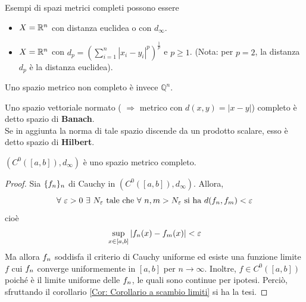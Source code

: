 \begin{example}
    Esempi di spazi metrici completi possono essere
    \begin{itemize}
        \item $X=\mathbb{R}^n$ con distanza euclidea o con $d_\infty$.
        \item $X=\mathbb{R}^n$ con $d_p= \left(\sum\limits_{i=1}^{n}{|x_i - y_i|^p}\right)^{\frac{1}{p}}$ e $p\geq 1$. (Nota: per $p=2$, la distanza $d_p$ è la distanza euclidea).
    \end{itemize}
    Uno spazio metrico non completo è invece $\mathbb{Q}^n$.
\end{example}
\begin{oss}
    Uno spazio vettoriale normato ( $\Rightarrow$ metrico con $d(x, y)= |x-y|$) completo è detto spazio di \textbf{Banach}.\\
    Se in aggiunta la norma di tale spazio discende da un prodotto scalare, esso è detto spazio di \textbf{Hilbert}.
\end{oss}
\begin{theorem}
    $(C^0([a,b]), d_\infty)$ è uno spazio metrico completo.
\end{theorem}
\begin{proof}
    Sia $\{f_n\}_n$ di Cauchy in $(C^0([a,b]), d_\infty)$. Allora, 
    \begin{equation}
          \forall\ \varepsilon>0\ \exists\ N_\varepsilon\ \text{tale che}\ \forall\ n,m > N_\varepsilon\ \text{si ha}\ d(\fn, f_m)< \varepsilon
    \end{equation}
    cioè 
    \begin{equation}
     \sup\limits_{x \in [a,b]}{|f_n(x)-f_m(x)|}< \varepsilon
    \end{equation}
    Ma allora $f_n$ soddisfa il criterio di Cauchy uniforme ed esiste una funzione limite $f$ cui $f_n$ converge uniformemente in $[a,b]$ per $n \to \infty$. Inoltre, $f \in C^0([a,b])$ poiché è il limite uniforme delle $f_n$, le quali sono continue per ipotesi. Perciò, sfruttando il corollario \ref{Cor: Corollario a scambio limiti} si ha la tesi.
\end{proof}
